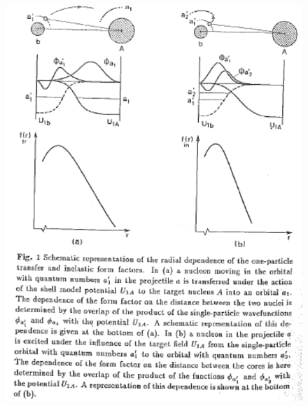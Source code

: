 \documentclass[a4paper,11pt]{book}
\numberwithin{equation}{section}
\numberwithin{figure}{section}
\numberwithin{table}{section}
\begin{document}
\begin{subappendices}
\begin{figure}
\centerline{\includegraphics*[width=\textwidth,angle=0]{figs/fig_4.pdf}}
\caption{}\label{fig_4}
\end{figure}
\end{subappendices}

















 
 
\end{document}
